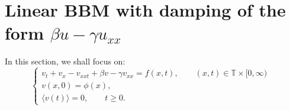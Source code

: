 \documentclass[10pt,a4paper,final]{article}
\numberwithin{equation}{section}
\newtheorem{lemma}[theorem]{Lemma}
\newcommand{\lan}{\langle}
\newcommand{\ran}{\rangle}
\newcommand{\R}{\mathbb{R}}
\newcommand{\bT}{\mathbb{T}}
\newcommand{\Gb}{\beta}
\newcommand{\Gg}{\gamma}
\begin{document}



\section{Linear BBM with damping of the form $\Gb u-\Gg u_{xx}$} \label{Sec3}
In this section, we shall focus on:
\begin{equation} \label{sub1}
\begin{cases}
    v_t+v_x-v_{xxt}+\beta v-\gamma v_{xx}=f(x,t), \quad\quad (x, t)\in \bT\times [0, \infty)&\\
    v(x,0)=\phi(x), &\\
    \langle v(t) \rangle=0,  \quad\quad t\geq 0.&
\end{cases}
\end{equation}
\end{document}
